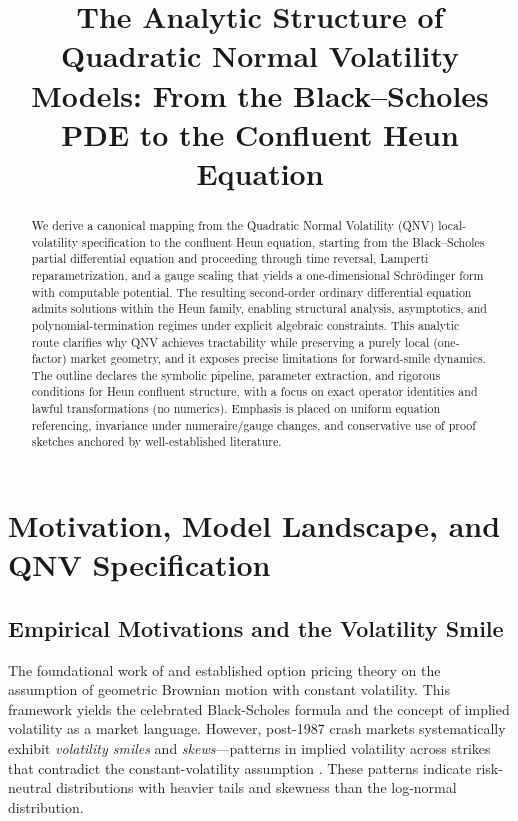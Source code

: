 \documentclass[a4paper,11pt]{article}
\title{\textbf{The Analytic Structure of Quadratic Normal Volatility Models: From the Black--Scholes PDE to the Confluent Heun Equation}}
\author{}
\date{}
\begin{document}
\maketitle

\begin{abstract}
We derive a canonical mapping from the Quadratic Normal Volatility (QNV) local-volatility specification to the confluent Heun equation, starting from the Black--Scholes partial differential equation and proceeding through time reversal, Lamperti reparametrization, and a gauge scaling that yields a one-dimensional Schr\"{o}dinger form with computable potential. The resulting second-order ordinary differential equation admits solutions within the Heun family, enabling structural analysis, asymptotics, and polynomial-termination regimes under explicit algebraic constraints. This analytic route clarifies why QNV achieves tractability while preserving a purely local (one-factor) market geometry, and it exposes precise limitations for forward-smile dynamics. The outline declares the symbolic pipeline, parameter extraction, and rigorous conditions for Heun confluent structure, with a focus on exact operator identities and lawful transformations (no numerics). Emphasis is placed on uniform equation referencing, invariance under numeraire/gauge changes, and conservative use of proof sketches anchored by well-established literature.
\end{abstract}

\section{Motivation, Model Landscape, and QNV Specification}

\subsection{Empirical Motivations and the Volatility Smile}

The foundational work of \cite{BlackScholes1973} and \cite{Merton1973} established option pricing theory on the assumption of geometric Brownian motion with constant volatility. This framework yields the celebrated Black-Scholes formula and the concept of implied volatility as a market language. However, post-1987 crash markets systematically exhibit \textit{volatility smiles} and \textit{skews}—patterns in implied volatility across strikes that contradict the constant-volatility assumption \cite{Gatheral2006}. These patterns indicate risk-neutral distributions with heavier tails and skewness than the log-normal distribution.
\end{document}
